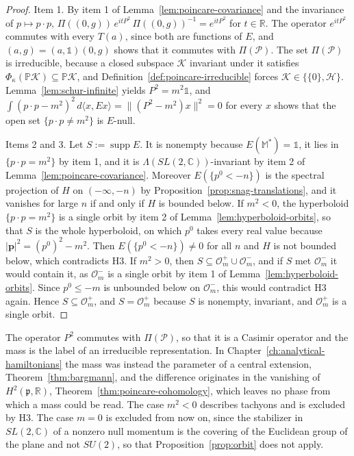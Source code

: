 \begin{proof}
	Item 1. By item 1 of Lemma~\ref{lem:poincare-covariance} and the invariance of $p\mapsto p\cdot p$, $\Pi((0,g))\,e^{itP^2}\,\Pi((0,g))^{-1}=e^{itP^2}$ for $t\in\mathbb{R}$. The operator $e^{itP^2}$ commutes with every $T(a)$, since both are functions of $E$, and $(a,g)=(a,\mathbb{1})(0,g)$ shows that it commutes with $\Pi(\mathcal{P})$. The set $\Pi(\mathcal{P})$ is irreducible, because a closed subspace $\mathcal{K}$ invariant under it satisfies $\Phi_\kappa(\mathbb{P}\mathcal{K})\subseteq\mathbb{P}\mathcal{K}$, and Definition~\ref{def:poincare-irreducible} forces $\mathcal{K}\in\{\{0\},\mathcal{H}\}$. Lemma~\ref{lem:schur-infinite} yields $P^2=m^2\mathbb{1}$, and $\int(p\cdot p-m^2)^2\,d\langle x,Ex\rangle=\|(P^2-m^2)x\|^2=0$ for every $x$ shows that the open set $\{p\cdot p\neq m^2\}$ is $E$-null.
	
	Items 2 and 3. Let $S:=\operatorname{supp}E$. It is nonempty because $E(\mathbb{M}^*)=\mathbb{1}$, it lies in $\{p\cdot p=m^2\}$ by item 1, and it is $\Lambda(SL(2,\mathbb{C}))$-invariant by item 2 of Lemma~\ref{lem:poincare-covariance}. Moreover $E(\{p^0<-n\})$ is the spectral projection of $H$ on $(-\infty,-n)$ by Proposition~\ref{prop:snag-translations}, and it vanishes for large $n$ if and only if $H$ is bounded below. If $m^2<0$, the hyperboloid $\{p\cdot p=m^2\}$ is a single orbit by item 2 of Lemma~\ref{lem:hyperboloid-orbits}, so that $S$ is the whole hyperboloid, on which $p^0$ takes every real value because $|\mathbf{p}|^2=(p^0)^2-m^2$. Then $E(\{p^0<-n\})\neq0$ for all $n$ and $H$ is not bounded below, which contradicts H3. If $m^2>0$, then $S\subseteq\mathcal{O}_m^+\cup\mathcal{O}_m^-$, and if $S$ met $\mathcal{O}_m^-$ it would contain it, as $\mathcal{O}_m^-$ is a single orbit by item 1 of Lemma~\ref{lem:hyperboloid-orbits}. Since $p^0\leq-m$ is unbounded below on $\mathcal{O}_m^-$, this would contradict H3 again. Hence $S\subseteq\mathcal{O}_m^+$, and $S=\mathcal{O}_m^+$ because $S$ is nonempty, invariant, and $\mathcal{O}_m^+$ is a single orbit.
\end{proof}

\begin{remark}\label{rem:massless}
	The operator $P^2$ commutes with $\Pi(\mathcal{P})$, so that it is a Casimir operator and the mass is the label of an irreducible representation. In Chapter~\ref{ch:analytical-hamiltonians} the mass was instead the parameter of a central extension, Theorem~\ref{thm:bargmann}, and the difference originates in the vanishing of $H^2(\mathfrak{p},\mathbb{R})$, Theorem~\ref{thm:poincare-cohomology}, which leaves no phase from which a mass could be read. The case $m^2<0$ describes tachyons and is excluded by H3. The case $m=0$ is excluded from now on, since the stabilizer in $SL(2,\mathbb{C})$ of a nonzero null momentum is the covering of the Euclidean group of the plane \cite[TODO-location]{TODO-BarutRaczka} and not $SU(2)$, so that Proposition~\ref{prop:orbit} does not apply.
\end{remark}

